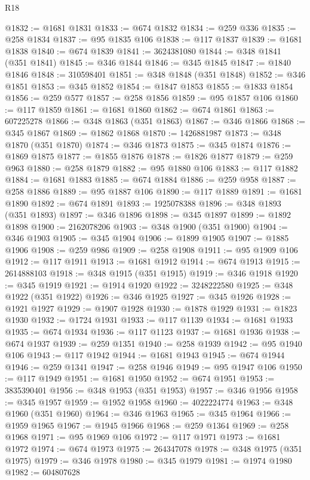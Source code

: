 \begin{lexlean}{R18}
\begin{coremodule}
@1832 := @1681 @1831
@1833 := @674 @1832
@1834 := @259 @336
@1835 := @258 @1834
@1837 := @95 @1835 @106
@1838 := @117 @1837
@1839 := @1681 @1838
@1840 := @674 @1839
@1841 := 3624381080
@1844 := @348 @1841 (@351 @1841)
@1845 := @346 @1844
@1846 := @345 @1845
@1847 := @1840 @1846
@1848 := 310598401
@1851 := @348 @1848 (@351 @1848)
@1852 := @346 @1851
@1853 := @345 @1852
@1854 := @1847 @1853
@1855 := @1833 @1854
@1856 := @259 @577
@1857 := @258 @1856
@1859 := @95 @1857 @106
@1860 := @117 @1859
@1861 := @1681 @1860
@1862 := @674 @1861
@1863 := 607225278
@1866 := @348 @1863 (@351 @1863)
@1867 := @346 @1866
@1868 := @345 @1867
@1869 := @1862 @1868
@1870 := 1426881987
@1873 := @348 @1870 (@351 @1870)
@1874 := @346 @1873
@1875 := @345 @1874
@1876 := @1869 @1875
@1877 := @1855 @1876
@1878 := @1826 @1877
@1879 := @259 @963
@1880 := @258 @1879
@1882 := @95 @1880 @106
@1883 := @117 @1882
@1884 := @1681 @1883
@1885 := @674 @1884
@1886 := @259 @958
@1887 := @258 @1886
@1889 := @95 @1887 @106
@1890 := @117 @1889
@1891 := @1681 @1890
@1892 := @674 @1891
@1893 := 1925078388
@1896 := @348 @1893 (@351 @1893)
@1897 := @346 @1896
@1898 := @345 @1897
@1899 := @1892 @1898
@1900 := 2162078206
@1903 := @348 @1900 (@351 @1900)
@1904 := @346 @1903
@1905 := @345 @1904
@1906 := @1899 @1905
@1907 := @1885 @1906
@1908 := @259 @986
@1909 := @258 @1908
@1911 := @95 @1909 @106
@1912 := @117 @1911
@1913 := @1681 @1912
@1914 := @674 @1913
@1915 := 2614888103
@1918 := @348 @1915 (@351 @1915)
@1919 := @346 @1918
@1920 := @345 @1919
@1921 := @1914 @1920
@1922 := 3248222580
@1925 := @348 @1922 (@351 @1922)
@1926 := @346 @1925
@1927 := @345 @1926
@1928 := @1921 @1927
@1929 := @1907 @1928
@1930 := @1878 @1929
@1931 := @1823 @1930
@1932 := @1724 @1931
@1933 := @117 @1139
@1934 := @1681 @1933
@1935 := @674 @1934
@1936 := @117 @1123
@1937 := @1681 @1936
@1938 := @674 @1937
@1939 := @259 @1351
@1940 := @258 @1939
@1942 := @95 @1940 @106
@1943 := @117 @1942
@1944 := @1681 @1943
@1945 := @674 @1944
@1946 := @259 @1341
@1947 := @258 @1946
@1949 := @95 @1947 @106
@1950 := @117 @1949
@1951 := @1681 @1950
@1952 := @674 @1951
@1953 := 3835390401
@1956 := @348 @1953 (@351 @1953)
@1957 := @346 @1956
@1958 := @345 @1957
@1959 := @1952 @1958
@1960 := 4022224774
@1963 := @348 @1960 (@351 @1960)
@1964 := @346 @1963
@1965 := @345 @1964
@1966 := @1959 @1965
@1967 := @1945 @1966
@1968 := @259 @1364
@1969 := @258 @1968
@1971 := @95 @1969 @106
@1972 := @117 @1971
@1973 := @1681 @1972
@1974 := @674 @1973
@1975 := 264347078
@1978 := @348 @1975 (@351 @1975)
@1979 := @346 @1978
@1980 := @345 @1979
@1981 := @1974 @1980
@1982 := 604807628

\end{coremodule}
\end{lexlean}
